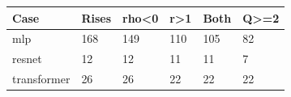 \begin{tabular}{@{}llllll@{}}
\toprule
Case & Rises & rho<0 & r>1 & Both & Q>=2 \\
\midrule
mlp & 168 & 149 & 110 & 105 & 82 \\
resnet & 12 & 12 & 11 & 11 & 7 \\
transformer & 26 & 26 & 22 & 22 & 22 \\
\bottomrule
\end{tabular}
